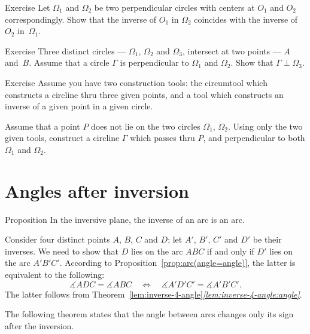 \begin{thm}{Exercise}\label{ex:centers-of-perp-circles}
Let $\Omega_1$ and $\Omega_2$ be two perpendicular circles with centers at $O_1$ and $O_2$ correspondingly.
Show that the inverse of $O_1$ in $\Omega_2$ 
coincides with 
the inverse of $O_2$ in~$\Omega_1$.
\end{thm}

\begin{thm}{Exercise}\label{ex:4-th-perp-circ}
Three distinct circles --- $\Omega_1$, $\Omega_2$ and $\Omega_3$, intersect at two points --- $A$ and~$B$.
Assume that a circle $\Gamma$ is perpendicular to $\Omega_1$ and $\Omega_2$.
Show that $\Gamma\perp\Omega_3$.
\end{thm}

\begin{thm}{Exercise}\label{ex:construction-perp-clines}
Assume you have two construction tools:
the circumtool which constructs a circline thru three given points, 
and a tool  which constructs an inverse of a given point in a given circle.

Assume that a point $P$ does not lie on the two circles $\Omega_1$, $\Omega_2$.
Using only the two given tools,
construct a circline $\Gamma$ which passes thru $P$, 
and perpendicular to both $\Omega_1$ and $\Omega_2$.
\end{thm}

\section*{Angles after inversion}

\begin{thm}{Proposition}
In the inversive plane, the inverse of an arc is an arc.

\end{thm}

Consider four distinct points $A$, $B$, $C$ and $D$; 
let $A'$, $B'$, $C'$ and $D'$  be their inverses.
We need to show that $D$ lies on the arc $ABC$ if and only if $D'$ lies on the arc $A'B'C'$.
According to Proposition~\ref{prop:arc(angle=angle)},
the latter is equivalent to the following:
$$\measuredangle ADC= \measuredangle ABC
\quad
\iff
\quad  
\measuredangle A'D'C'= \measuredangle A'B'C'.$$
The latter follows from Theorem~\ref{lem:inverse-4-angle}\textit{\ref{lem:inverse-4-angle:angle}}.
\qeds

The following theorem states that the angle between arcs changes only its sign after the inversion.




